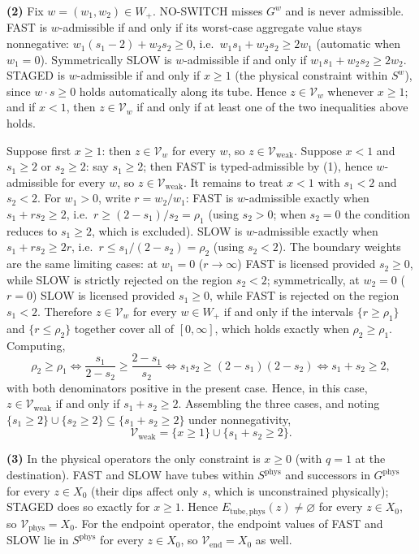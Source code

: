 \documentclass[3p,11pt]{elsarticle}
\begin{document}
\textbf{(2)} Fix \(w = (w_1, w_2) \in W_+\). NO-SWITCH misses \(G^w\)
and is never admissible. FAST is \(w\)-admissible if and only if its
worst-case aggregate value stays nonnegative:
\(w_1(s_1 - 2) + w_2 s_2 \ge 0\), i.e.~\(w_1 s_1 + w_2 s_2 \ge 2 w_1\)
(automatic when \(w_1 = 0\)). Symmetrically SLOW is \(w\)-admissible if
and only if \(w_1 s_1 + w_2 s_2 \ge 2 w_2\). STAGED is \(w\)-admissible
if and only if \(x \ge 1\) (the physical constraint within \(S^w\)),
since \(w \cdot s \ge 0\) holds automatically along its tube. Hence
\(z \in \mathcal{V}_w\) whenever \(x \ge 1\); and if \(x < 1\), then
\(z \in \mathcal{V}_w\) if and only if at least one of the two
inequalities above holds.

Suppose first \(x \ge 1\): then \(z \in \mathcal{V}_w\) for every \(w\),
so \(z \in \mathcal{V}_{\mathrm{weak}}\). Suppose \(x < 1\) and
\(s_1 \ge 2\) or \(s_2 \ge 2\): say \(s_1 \ge 2\); then FAST is
typed-admissible by (1), hence \(w\)-admissible for every \(w\), so
\(z \in \mathcal{V}_{\mathrm{weak}}\). It remains to treat \(x < 1\)
with \(s_1 < 2\) and \(s_2 < 2\). For \(w_1 > 0\), write
\(r = w_2/w_1\): FAST is \(w\)-admissible exactly when
\(s_1 + r s_2 \ge 2\), i.e.~\(r \ge (2 - s_1)/s_2 = \rho_1\) (using
\(s_2 > 0\); when \(s_2 = 0\) the condition reduces to \(s_1 \ge 2\),
which is excluded). SLOW is \(w\)-admissible exactly when
\(s_1 + r s_2 \ge 2r\), i.e.~\(r \le s_1/(2 - s_2) = \rho_2\) (using
\(s_2 < 2\)). The boundary weights are the same limiting cases: at
\(w_1 = 0\) (\(r \to \infty\)) FAST is licensed provided \(s_2 \ge 0\),
while SLOW is strictly rejected on the region \(s_2 < 2\);
symmetrically, at \(w_2 = 0\) (\(r = 0\)) SLOW is licensed provided
\(s_1 \ge 0\), while FAST is rejected on the region \(s_1 < 2\).
Therefore \(z \in \mathcal{V}_w\) for every \(w \in W_+\) if and only if
the intervals \(\{r \ge \rho_1\}\) and \(\{r \le \rho_2\}\) together
cover all of \([0, \infty]\), which holds exactly when
\(\rho_2 \ge \rho_1\). Computing,
\[\rho_2 \ge \rho_1 \iff \frac{s_1}{2 - s_2} \ge \frac{2 - s_1}{s_2} \iff s_1 s_2 \ge (2 - s_1)(2 - s_2) \iff s_1 + s_2 \ge 2,\]
with both denominators positive in the present case. Hence, in this
case, \(z \in \mathcal{V}_{\mathrm{weak}}\) if and only if
\(s_1 + s_2 \ge 2\). Assembling the three cases, and noting
\(\{s_1 \ge 2\} \cup \{s_2 \ge 2\} \subseteq \{s_1 + s_2 \ge 2\}\) under
nonnegativity,
\[\mathcal{V}_{\mathrm{weak}} = \{ x \ge 1 \} \cup \{ s_1 + s_2 \ge 2 \}.\]

\textbf{(3)} In the physical operators the only constraint is
\(x \ge 0\) (with \(q = 1\) at the destination). FAST and SLOW have
tubes within \(S^{\mathrm{phys}}\) and successors in
\(G^{\mathrm{phys}}\) for every \(z \in X_0\) (their dips affect only
\(s\), which is unconstrained physically); STAGED does so exactly for
\(x \ge 1\). Hence \(E_{\mathrm{tube,phys}}(z) \neq \varnothing\) for
every \(z \in X_0\), so \(\mathcal{V}_{\mathrm{phys}} = X_0\). For the
endpoint operator, the endpoint values of FAST and SLOW lie in
\(S^{\mathrm{phys}}\) for every \(z \in X_0\), so
\(\mathcal{V}_{\mathrm{end}} = X_0\) as well.
\end{document}
